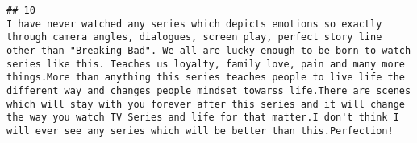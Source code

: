 \documentclass[
]{article}
\begin{document}
\begin{verbatim}
## 10                                                                                                                                                                                                                                                                                                                                                                                                                                                                                                                                                                                                                                                                                                                                                                                                                                                                                                                                                                                                                                                                                                                                                                                                                                                                                                                                                                                                                                                                                                                                                                     I have never watched any series which depicts emotions so exactly through camera angles, dialogues, screen play, perfect story line other than "Breaking Bad". We all are lucky enough to be born to watch series like this. Teaches us loyalty, family love, pain and many more things.More than anything this series teaches people to live life the different way and changes people mindset towarss life.There are scenes which will stay with you forever after this series and it will change the way you watch TV Series and life for that matter.I don't think I will ever see any series which will be better than this.Perfection!

\end{verbatim}
\end{document}
